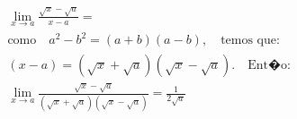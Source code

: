 \begin{ex}
\begin{align}
&\lim_{x\rightarrow a} \frac{\sqrt{x}-\sqrt{a}}{x-a}=\nonumber\\
&\text{como}\quad{a^2-b^2=(a+b)(a-b)},\quad\text{temos que:}\nonumber\\
&(x-a) = (\sqrt{x}+\sqrt{a})(\sqrt{x}-\sqrt{a}).\quad\text{Ent�o:}\nonumber\\
&\lim_{x\rightarrow a} \frac{\sqrt{x}-\sqrt{a}}{(\sqrt{x}+\sqrt{a})(\sqrt{x}-\sqrt{a})}=\frac{1}{2\sqrt{a}}\nonumber
\end{align}
\end{ex}